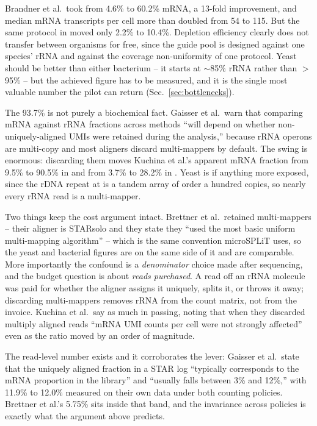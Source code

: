  Brandner et al.\ took
 from 4.6\% to 60.2\% mRNA, a 13-fold improvement, and median mRNA
transcripts per cell more than doubled from 54 to 115. But the same protocol in
 moved only 2.2\% to 10.4\%. Depletion efficiency clearly does
not transfer between organisms for free, since the guide pool is designed against
one species' rRNA and against the coverage non-uniformity of one protocol. Yeast
should be better than either bacterium -- it starts at $\sim$85\% rRNA rather
than $>$95\% -- but the achieved figure has to be measured, and it is the single
most valuable number the pilot can return (Sec.~\ref{sec:bottlenecks}).

 The 93.7\% is not purely a biochemical fact. Gaisser
et al.\ warn that comparing mRNA against rRNA fractions across methods ``will
depend on whether non-uniquely-aligned UMIs were retained during the analysis,''
because rRNA operons are multi-copy and most aligners discard multi-mappers by
default. The swing is enormous: discarding them moves Kuchina et al.'s apparent
mRNA fraction from 9.5\% to 90.5\% in  and from 3.7\% to
28.2\% in . Yeast is if anything more exposed, since the rDNA
repeat at  is a tandem array of order a hundred copies, so nearly
every rRNA read is a multi-mapper.

Two things keep the cost argument intact. Brettner et al.\ retained multi-mappers
-- their aligner is STARsolo and they state they ``used the most basic uniform
multi-mapping algorithm'' -- which is the same convention microSPLiT uses, so the
yeast and bacterial figures are on the same side of it and are comparable. More
importantly the confound is a \emph{denominator} choice made after sequencing,
and the budget question is about \emph{reads purchased}. A read off an rRNA
molecule was paid for whether the aligner assigns it uniquely, splits it, or
throws it away; discarding multi-mappers removes rRNA from the count matrix, not
from the invoice. Kuchina et al.\ say as much in passing, noting that when they
discarded multiply aligned reads ``mRNA UMI counts per cell were not strongly
affected'' even as the ratio moved by an order of magnitude.

The read-level number exists and it corroborates the lever: Gaisser et al.\ state
that the uniquely aligned fraction in a STAR log ``typically corresponds to the
mRNA proportion in the library'' and ``usually falls between 3\% and 12\%,''
with 11.9\% to 12.0\% measured on their own  data under both
counting policies. Brettner et al.'s 5.75\% sits inside that band, and the
invariance across policies is exactly what the argument above predicts.

